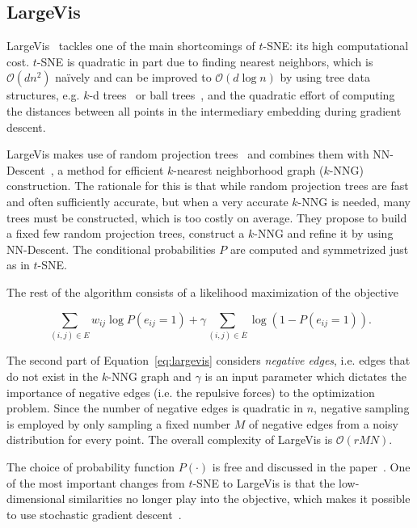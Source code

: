 \subsection{LargeVis}

LargeVis~\cite{largevis} tackles one of the main shortcomings of $t$-SNE: its
high computational cost. $t$-SNE is quadratic in part due to finding nearest
neighbors, which is $\mathcal{O}(dn^2)$ na\"ively and can be improved to
$\mathcal{O}(d \log n)$ by using tree data structures, e.g. $k$-d
trees~\cite{kd_tree, kd_tree_rev} or ball trees~\cite{balltree}, and the
quadratic effort of computing the distances between all points in the
intermediary embedding during gradient descent.

LargeVis makes use of random projection trees~\cite{rand_proj_trees,
rand_proj_trees_rev} and combines them with
NN-Descent~\cite{nn_descent}, a method for efficient $k$-nearest
neighborhood graph ($k$-NNG) construction. The rationale for this is that while
random projection trees are fast and often sufficiently accurate, but when a
very accurate $k$-NNG is needed, many trees must be constructed, which is too
costly on average. They propose to build a fixed few random projection trees,
construct a $k$-NNG and refine it by using NN-Descent. The conditional
probabilities $P$ are computed and symmetrized just as in
$t$-SNE.

The rest of the algorithm consists of a likelihood maximization of the objective

\begin{equation}
    \sum_{(i, j) \in E} w_{ij} \log P(e_{ij} = 1) + \gamma \sum_{(i, j) \in \overline{E}} \log ( 1 - P(e_{ij} = 1) ).
    \label{eq:largevis}
\end{equation}

The second part of Equation~\ref{eq:largevis} considers \emph{negative edges},
i.e. edges that do not exist in the $k$-NNG graph and $\gamma$ is an input
parameter which dictates the importance of negative edges (i.e. the repulsive
forces) to the optimization problem. Since the number of negative edges is
quadratic in $n$, negative sampling is employed by only sampling a fixed number
$M$ of negative edges from a noisy distribution for every point. The overall
complexity of LargeVis is $\mathcal{O}(rMN)$.

The choice of probability function $P(\cdot)$ is free and discussed in the
paper~\cite{largevis}. One of the most important changes from $t$-SNE to
LargeVis is that the low-dimensional similarities no longer play into the
objective, which makes it possible to use stochastic gradient
descent~\cite{largevis}.

